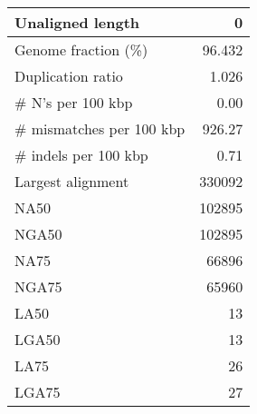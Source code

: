 \documentclass[12pt,a4paper]{article}
\begin{document}
\begin{table}[ht]
\begin{center}
\begin{tabular}{|l*{1}{|r}|}
Unaligned length & 0 \\ \hline
Genome fraction (\%) & 96.432 \\ \hline
Duplication ratio & 1.026 \\ \hline
\# N's per 100 kbp & 0.00 \\ \hline
\# mismatches per 100 kbp & 926.27 \\ \hline
\# indels per 100 kbp & 0.71 \\ \hline
Largest alignment & 330092 \\ \hline
NA50 & 102895 \\ \hline
NGA50 & 102895 \\ \hline
NA75 & 66896 \\ \hline
NGA75 & 65960 \\ \hline
LA50 & 13 \\ \hline
LGA50 & 13 \\ \hline
LA75 & 26 \\ \hline
LGA75 & 27 \\ \hline
\end{tabular}
\end{center}
\end{table}
\end{document}
